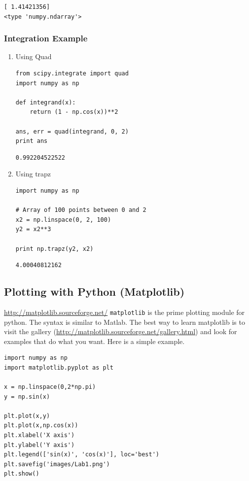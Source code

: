 \documentclass[11pt]{article}
\begin{document}
\begin{verbatim}
[ 1.41421356]
<type 'numpy.ndarray'>
\end{verbatim}



\subsubsection{Integration Example}
\label{sec-3-12-2}

\begin{enumerate}
\item Using Quad
\label{sec-3-12-2-1}
\begin{verbatim}
from scipy.integrate import quad
import numpy as np

def integrand(x):
    return (1 - np.cos(x))**2

ans, err = quad(integrand, 0, 2)
print ans
\end{verbatim}

\begin{verbatim}
0.992204522522
\end{verbatim}


\item Using trapz
\label{sec-3-12-2-2}

\begin{verbatim}
import numpy as np

# Array of 100 points between 0 and 2
x2 = np.linspace(0, 2, 100)
y2 = x2**3

print np.trapz(y2, x2)
\end{verbatim}

\begin{verbatim}
4.00040812162
\end{verbatim}
\end{enumerate}


\subsection{Plotting with Python (Matplotlib)}
\label{sec-3-13}
\url{http://matplotlib.sourceforge.net/}
\texttt{matplotlib} is the prime plotting module for python. The syntax is similar to Matlab. The best way to learn matplotlib is to visit the gallery (\url{http://matplotlib.sourceforge.net/gallery.html}) and look for examples that do what you want. Here is a simple example.

\begin{verbatim}
import numpy as np
import matplotlib.pyplot as plt

x = np.linspace(0,2*np.pi)
y = np.sin(x)

plt.plot(x,y)
plt.plot(x,np.cos(x))
plt.xlabel('X axis')
plt.ylabel('Y axis')
plt.legend(['sin(x)', 'cos(x)'], loc='best')
plt.savefig('images/Lab1.png')
plt.show()
\end{verbatim}
\end{document}

